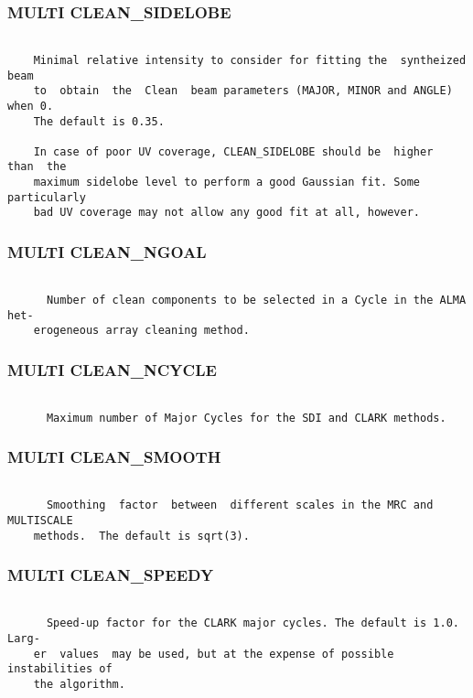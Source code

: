 \subsubsection{MULTI CLEAN\_SIDELOBE}
\begin{verbatim}

    Minimal relative intensity to consider for fitting the  syntheized  beam
    to  obtain  the  Clean  beam parameters (MAJOR, MINOR and ANGLE) when 0.
    The default is 0.35.

    In case of poor UV coverage, CLEAN_SIDELOBE should be  higher  than  the
    maximum sidelobe level to perform a good Gaussian fit. Some particularly
    bad UV coverage may not allow any good fit at all, however.

\end{verbatim}
\subsubsection{MULTI CLEAN\_NGOAL}
\begin{verbatim}

      Number of clean components to be selected in a Cycle in the ALMA  het-
    erogeneous array cleaning method.

\end{verbatim}
\subsubsection{MULTI CLEAN\_NCYCLE}
\begin{verbatim}

      Maximum number of Major Cycles for the SDI and CLARK methods.

\end{verbatim}
\subsubsection{MULTI CLEAN\_SMOOTH}
\begin{verbatim}

      Smoothing  factor  between  different scales in the MRC and MULTISCALE
    methods.  The default is sqrt(3).

\end{verbatim}
\subsubsection{MULTI CLEAN\_SPEEDY}
\begin{verbatim}

      Speed-up factor for the CLARK major cycles. The default is 1.0.  Larg-
    er  values  may be used, but at the expense of possible instabilities of
    the algorithm.

\end{verbatim}
